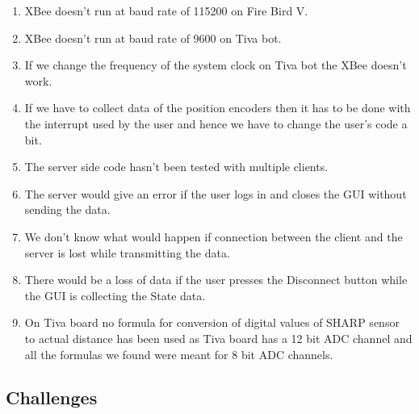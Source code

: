 \documentclass[a4paper,12pt,oneside]{book}
\begin{document}
\begin{enumerate}

\item XBee doesn't run at baud rate of 115200 on Fire Bird V.
\item XBee doesn't run at baud rate of 9600 on Tiva bot.
\item If we change the frequency of the system clock on Tiva bot the XBee doesn't work.
\item If we have to collect data of the position encoders then it has to be done with the interrupt used by the user and hence we have to change the user's code a bit.
\item The server side code hasn't been tested with multiple clients.
\item The server would give an error if the user logs in and closes the GUI without sending the data.
\item We don't know what would happen if connection between the client and the server is lost while transmitting the data.
\item There would be a loss of data if the user presses the Disconnect button while the GUI is collecting the State data.
\item On Tiva board no formula for conversion of digital values of SHARP sensor to actual distance has been used as Tiva board has a 12 bit ADC channel and all the formulas we found were meant for 8 bit ADC channels.

\end{enumerate}

\subsection{Challenges}
\end{document}
